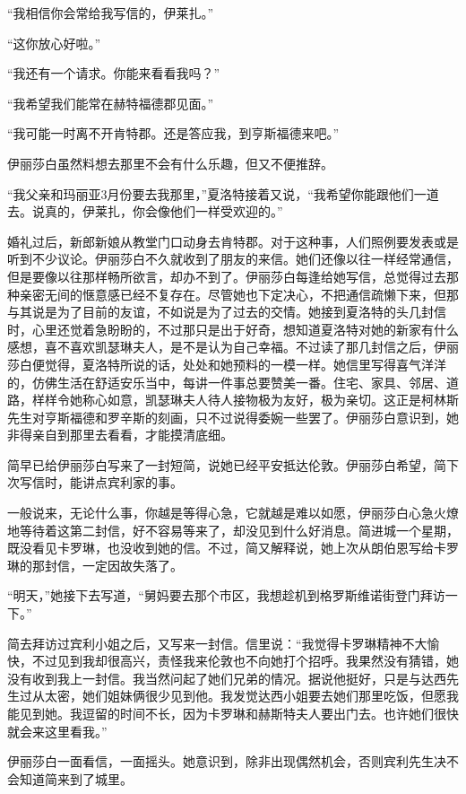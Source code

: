 \par “我相信你会常给我写信的，伊莱扎。”
\par “这你放心好啦。”
\par “我还有一个请求。你能来看看我吗？”
\par “我希望我们能常在赫特福德郡见面。”
\par “我可能一时离不开肯特郡。还是答应我，到亨斯福德来吧。”
\par 伊丽莎白虽然料想去那里不会有什么乐趣，但又不便推辞。
\par “我父亲和玛丽亚3月份要去我那里，”夏洛特接着又说，“我希望你能跟他们一道去。说真的，伊莱扎，你会像他们一样受欢迎的。”
\par 婚礼过后，新郎新娘从教堂门口动身去肯特郡。对于这种事，人们照例要发表或是听到不少议论。伊丽莎白不久就收到了朋友的来信。她们还像以往一样经常通信，但是要像以往那样畅所欲言，却办不到了。伊丽莎白每逢给她写信，总觉得过去那种亲密无间的惬意感已经不复存在。尽管她也下定决心，不把通信疏懒下来，但那与其说是为了目前的友谊，不如说是为了过去的交情。她接到夏洛特的头几封信时，心里还觉着急盼盼的，不过那只是出于好奇，想知道夏洛特对她的新家有什么感想，喜不喜欢凯瑟琳夫人，是不是认为自己幸福。不过读了那几封信之后，伊丽莎白便觉得，夏洛特所说的话，处处和她预料的一模一样。她信里写得喜气洋洋的，仿佛生活在舒适安乐当中，每讲一件事总要赞美一番。住宅、家具、邻居、道路，样样令她称心如意，凯瑟琳夫人待人接物极为友好，极为亲切。这正是柯林斯先生对亨斯福德和罗辛斯的刻画，只不过说得委婉一些罢了。伊丽莎白意识到，她非得亲自到那里去看看，才能摸清底细。
\par 简早已给伊丽莎白写来了一封短简，说她已经平安抵达伦敦。伊丽莎白希望，简下次写信时，能讲点宾利家的事。
\par 一般说来，无论什么事，你越是等得心急，它就越是难以如愿，伊丽莎白心急火燎地等待着这第二封信，好不容易等来了，却没见到什么好消息。简进城一个星期，既没看见卡罗琳，也没收到她的信。不过，简又解释说，她上次从朗伯恩写给卡罗琳的那封信，一定因故失落了。
\par “明天，”她接下去写道，“舅妈要去那个市区，我想趁机到格罗斯维诺街登门拜访一下。”
\par 简去拜访过宾利小姐之后，又写来一封信。信里说：“我觉得卡罗琳精神不大愉快，不过见到我却很高兴，责怪我来伦敦也不向她打个招呼。我果然没有猜错，她没有收到我上一封信。我当然问起了她们兄弟的情况。据说他挺好，只是与达西先生过从太密，她们姐妹俩很少见到他。我发觉达西小姐要去她们那里吃饭，但愿我能见到她。我逗留的时间不长，因为卡罗琳和赫斯特夫人要出门去。也许她们很快就会来这里看我。”
\par 伊丽莎白一面看信，一面摇头。她意识到，除非出现偶然机会，否则宾利先生决不会知道简来到了城里。
